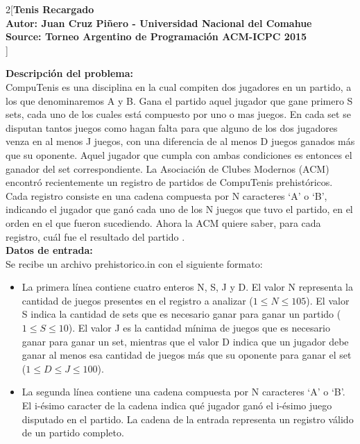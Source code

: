 \documentclass[a4paper,12pt]{article}
\begin{document}
\begin{multicols}{2}[\center\textbf{\large{Tenis Recargado\\\small{Autor: Juan Cruz Piñero - Universidad Nacional del Comahue\\ 
Source: Torneo Argentino de Programación ACM-ICPC 2015 \\}}}]

\author{}

\justify
\textbf{Descripción del problema:}\\
CompuTenis es una disciplina en la cual compiten dos jugadores en un partido, a los que denominaremos A y B. Gana el partido aquel jugador que gane primero S sets, cada uno de los cuales está compuesto por uno o mas juegos. En cada set se disputan tantos juegos como hagan falta para que alguno de los dos jugadores venza en al menos J juegos, con una diferencia de al menos D juegos ganados más que su oponente. Aquel jugador que cumpla con ambas condiciones es entonces el ganador del set correspondiente. La Asociación de Clubes Modernos (ACM) encontró recientemente un registro de partidos de CompuTenis prehistóricos. Cada registro consiste en una cadena compuesta por N caracteres ‘A’ o ‘B’, indicando el jugador que ganó cada uno de los N juegos que tuvo el partido, en el orden en el que fueron sucediendo. Ahora la ACM quiere saber, para cada registro, cuál fue el resultado del partido 
.\\

\textbf{Datos de entrada:}\\
Se recibe un archivo prehistorico.in con el siguiente formato:\\
\begin{itemize}
\item La primera línea contiene cuatro enteros N, S, J y D. El valor N representa la cantidad de juegos presentes en el registro a analizar ($1 \leq N \leq 105$). El valor S indica la cantidad de sets que es necesario ganar para ganar un partido ($1 \leq S \leq 10$). El valor J es la cantidad mínima de juegos que es necesario ganar para ganar un set, mientras que el valor D indica que un jugador debe ganar al menos esa cantidad de juegos más que su oponente para ganar el set ($1 \leq D \leq J \leq 100$). 
\item La segunda línea contiene una cadena compuesta por N caracteres ‘A’ o ‘B’. El i-ésimo caracter de la cadena indica qué jugador ganó el i-ésimo juego disputado en el partido. La cadena de la entrada representa un
registro válido de un partido completo.


\end{itemize}
\end{multicols}
\end{document}

